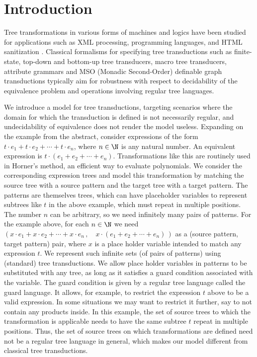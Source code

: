 \section{Introduction}\label{sec:introduction-trees}

Tree transformations in various forms of machines and logics have been studied for applications such as XML processing, programming languages, and HTML sanitization \cite{DVLM2015,Hosoya_2010,AK1998,MSV2000}. Classical formalisms for specifying tree transductions such as finite-state, top-down and bottom-up tree transducers, macro tree transducers, attribute grammars and MSO (Monadic Second-Order) definable graph transductions typically aim for robustness with respect to decidability of the equivalence problem and operations involving regular tree languages.

We introduce a model for tree transductions, targeting scenarios where the domain for which the transduction is defined is not necessarily regular, and undecidability of equivalence does not render the model useless. Expanding on the example from the abstract, consider expressions of the form $t \cdot e_1 + t \cdot e_2 + \cdots + t \cdot e_n$, where $n \in \N$ is any natural number. An equivalent expression is $t \cdot (e_1 + e_2 + \cdots + e_n)$. Transformations like this are routinely used in Horner's method, an efficient way to evaluate polynomials. We consider the corresponding expression trees and model this transformation by matching the source tree with a source pattern and the target tree with a target pattern. The patterns are themselves trees, which can have placeholder variables to represent subtrees like $t$ in the above example, which must repeat in multiple positions. The number $n$ can be arbitrary, so we need infinitely many pairs of patterns. For the example above, for each $n \in \N$ we need $(x \cdot e_1 + x \cdot e_2 + \cdots + x \cdot e_n\,, \quad x\cdot (e_1 + e_2 + \cdots + e_n)\,)$ as a  (source pattern, target pattern) pair, where $x$ is a place holder variable intended to match any expression $t$. We represent such infinite sets (of pairs of patterns) using (standard) tree transductions. We allow place holder variables in patterns to be substituted with any tree, as long as it satisfies a guard condition associated with the variable. The guard condition is given by a regular tree language called the guard language. It allows, for example, to restrict the expression $t$ above to be a valid expression. In some situations we may want to restrict it further, say to not contain any products inside. In this example, the set of source trees to which the transformation is applicable needs to have the same subtree $t$ repeat in multiple positions. Thus, the set of source trees on which transformations are defined need not be a regular tree language in general, which makes our model different from classical tree transductions. 

